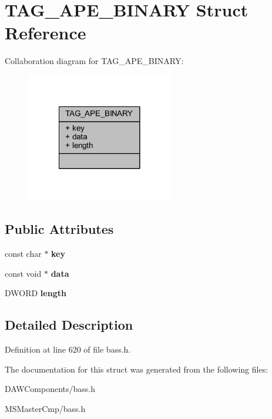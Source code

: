 \hypertarget{struct_t_a_g___a_p_e___b_i_n_a_r_y}{\section{T\-A\-G\-\_\-\-A\-P\-E\-\_\-\-B\-I\-N\-A\-R\-Y Struct Reference}
\label{struct_t_a_g___a_p_e___b_i_n_a_r_y}
}


Collaboration diagram for T\-A\-G\-\_\-\-A\-P\-E\-\_\-\-B\-I\-N\-A\-R\-Y\-:\nopagebreak
\begin{figure}[H]
\begin{center}
\leavevmode
\includegraphics[width=182pt]{struct_t_a_g___a_p_e___b_i_n_a_r_y__coll__graph}
\end{center}
\end{figure}
\subsection*{Public Attributes}
\begin{DoxyCompactItemize}
\item 
\hypertarget{struct_t_a_g___a_p_e___b_i_n_a_r_y_a851f32ddd93b19c89274b475f85d884d_a851f32ddd93b19c89274b475f85d884d}{const char $\ast$ {\bfseries key}}\label{struct_t_a_g___a_p_e___b_i_n_a_r_y_a851f32ddd93b19c89274b475f85d884d_a851f32ddd93b19c89274b475f85d884d}

\item 
\hypertarget{struct_t_a_g___a_p_e___b_i_n_a_r_y_a98bd1044d1225d1d194e40242639f829_a98bd1044d1225d1d194e40242639f829}{const void $\ast$ {\bfseries data}}\label{struct_t_a_g___a_p_e___b_i_n_a_r_y_a98bd1044d1225d1d194e40242639f829_a98bd1044d1225d1d194e40242639f829}

\item 
\hypertarget{struct_t_a_g___a_p_e___b_i_n_a_r_y_a7e3623a188e60d152fb9cdcd7a8f9668_a7e3623a188e60d152fb9cdcd7a8f9668}{D\-W\-O\-R\-D {\bfseries length}}\label{struct_t_a_g___a_p_e___b_i_n_a_r_y_a7e3623a188e60d152fb9cdcd7a8f9668_a7e3623a188e60d152fb9cdcd7a8f9668}

\end{DoxyCompactItemize}


\subsection{Detailed Description}


Definition at line 620 of file bass.\-h.



The documentation for this struct was generated from the following files\-:\begin{DoxyCompactItemize}
\item 
D\-A\-W\-Components/bass.\-h\item 
M\-S\-Master\-Cmp/bass.\-h\end{DoxyCompactItemize}

